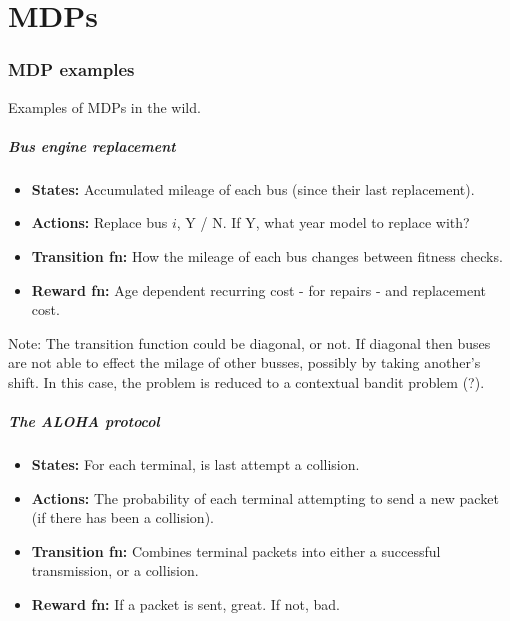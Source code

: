 \chapter{MDPs}

\subsection{MDP examples}
Examples of MDPs in the wild.

\hypertarget{bus-engine-replacement}{%
\paragraph{Bus engine replacement}\label{bus-engine-replacement}}

\begin{itemize}
\tightlist
\item
  \textbf{States:} Accumulated mileage of each bus (since their last
  replacement).
\item
  \textbf{Actions:} Replace bus \(i\), Y / N. If Y, what year model to
  replace with?
\item
  \textbf{Transition fn:} How the mileage of each bus changes between
  fitness checks.
\item
  \textbf{Reward fn:} Age dependent recurring cost - for repairs - and
  replacement cost.
\end{itemize}

Note: The transition function could be diagonal, or not. If diagonal
then buses are not able to effect the milage of other busses, possibly
by taking another's shift. In this case, the problem is reduced to a
contextual bandit problem (?).

\cite{Putterman2015}

\hypertarget{the-aloha-protocol}{%
\paragraph{The ALOHA protocol}\label{the-aloha-protocol}}

\begin{itemize}
\tightlist
\item
  \textbf{States:} For each terminal, is last attempt a collision.
\item
  \textbf{Actions:} The probability of each terminal attempting to send
  a new packet (if there has been a collision).
\item
  \textbf{Transition fn:} Combines terminal packets into either a
  successful transmission, or a collision.
\item
  \textbf{Reward fn:} If a packet is sent, great. If not, bad.
\end{itemize}

